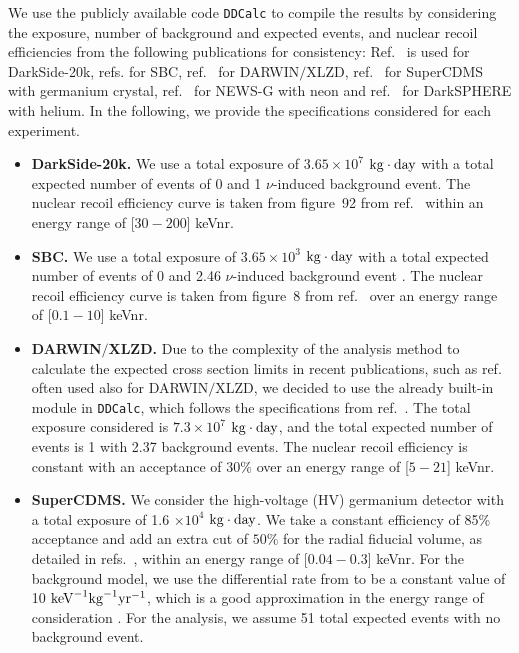 \documentclass[a4paper,11pt]{article}
\begin{document}
We use the publicly available code \texttt{DDCalc} \cite{GAMBITDarkMatterWorkgroup:2017fax} to compile the results by considering the exposure, number of background and expected events, and nuclear recoil efficiencies from the following publications for consistency:  Ref.~\cite{DarkSide-20k:2017zyg} is used for DarkSide-20k, refs. \cite{Alfonso-Pita:2023frp, Bressler:2022} for SBC, ref.~\cite{Schumann:2015cpa} for DARWIN$\slash$XLZD, ref.~\cite{SuperCDMS:2016wui} for SuperCDMS with germanium crystal, ref.~\cite{Durnford:2021mzg} for NEWS-G with neon and ref.~\cite{NEWS-G:2023qwh}  for DarkSPHERE with helium. In the following, we provide the specifications considered for each experiment.

\begin{itemize}
  \item \textbf{DarkSide-20k.} We use a total exposure of $3.65\times 10^{7}$ $\rm{kg}\cdot\rm{day}$ with a total expected number of events of 0 and 1 $\nu$-induced background event. The nuclear recoil efficiency curve is taken from figure~92 from ref.~\cite{DarkSide-20k:2017zyg} within an energy range of [$30 - 200$] keVnr.
  
  \item \textbf{SBC.} We use a total exposure of $3.65\times 10^{3}$ $\rm{kg}\cdot\rm{day}$ with a total expected number of events of 0 and 2.46 $\nu$-induced background event \cite{Bressler:2022}. The nuclear recoil efficiency curve is taken from figure~8 from ref.~\cite{Li:2024xzv} over an energy range of [$0.1 - 10$] keVnr.  
  
  \item \textbf{DARWIN$\slash$XLZD.} Due to the complexity of the analysis method to calculate the expected cross section limits in recent publications, such as ref.~\cite{Aalbers:2022dzr} often used also for DARWIN$\slash$XLZD, we decided to use the already built-in module in \texttt{DDCalc}, which follows the specifications from ref.~\cite{Schumann:2015cpa}. The total exposure considered is $7.3\times 10^{7}$ $\rm{kg}\cdot \rm{day}$, and the total expected number of events is 1 with 2.37 background events. The nuclear recoil efficiency is constant with an acceptance of $30\%$ over an energy range of [$5 - 21$] keVnr.



  \item \textbf{SuperCDMS.} We consider the high-voltage (HV) germanium detector with a total exposure of 1.6 $\times 10^{4}$ $\rm{kg}\cdot\rm{day}$. We take a constant efficiency of  85\% acceptance and add an extra cut of $50\%$ for the radial fiducial volume, as detailed in refs.~\cite{SuperCDMS:2016wui,SuperCDMS:2015eex}, within an energy range of [$0.04 - 0.3$] keVnr. For the background model, we use the differential rate from \cite{SuperCDMS:2016wui} to be a constant value of 10 $\rm{keV}^{-1} \rm{kg}^{-1} \rm{yr}^{-1}$, which is a good approximation in the energy range of consideration \cite{Smith-Orlik:2023kyl,Kahlhoefer:2017ddj}. For the analysis, we assume 51 total expected events with no background event. 


\end{itemize}
\end{document}
